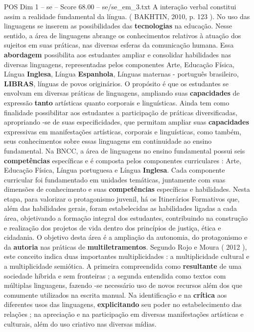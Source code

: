 \begin{textsample}{POS Dim 1 – se – Score 68.00 – se/se\_em\_3.txt}
A interação verbal constitui assim a realidade fundamental da língua. ( BAKHTIN, 2010, p. 123 ).
No uso das linguagens se inserem as possibilidades das \textbf{tecnologias} na educação.
Nesse sentido, a área de linguagens abrange os conhecimentos relativos à atuação dos sujeitos em suas práticas, nas diversas esferas da comunicação humana.
Essa \textbf{abordagem} possibilita aos estudantes ampliar e consolidar habilidades nas diversas linguagens, representadas pelos componentes Arte, Educação Física, Língua \textbf{Inglesa}, Língua \textbf{Espanhola}, Línguas maternas - português brasileiro, \textbf{LIBRAS}, línguas de povos originários.
O propósito é que os estudantes se envolvam em diversas práticas de linguagens, ampliando suas \textbf{capacidades} de expressão \textbf{tanto} artísticas quanto corporais e linguísticas.
Ainda tem como finalidade possibilitar aos estudantes a participação de práticas diversificadas, apropriando -se de suas especificidades, que permitam ampliar suas \textbf{capacidades} expressivas em manifestações artísticas, corporais e linguísticas, como também, seus conhecimentos sobre essas linguagens em continuidade ao ensino fundamental.
Na BNCC, a área de linguagens no ensino fundamental possui seis \textbf{competências} específicas e é composta pelos componentes curriculares : Arte, Educação Física, Língua portuguesa e Língua \textbf{Inglesa}.
Cada componente curricular foi fundamentado em unidades temáticas, juntamente com suas dimensões de conhecimento e suas \textbf{competências} específicas e habilidades.
Nesta etapa, para valorizar o protagonismo juvenil, há os Itinerários Formativos que, além das habilidades gerais, foram estabelecidas as habilidades ligadas a cada área, objetivando a formação integral dos estudantes, contribuindo na construção e realização dos projetos de vida dentro dos princípios de justiça, ética e cidadania.
O objetivo desta área é a ampliação da autonomia, do protagonismo e da \textbf{autoria} nas práticas de \textbf{multiletramentos}.
Segundo Rojo e Moura ( 2012 ), este conceito indica duas importantes multiplicidades : a multiplicidade cultural e a multiplicidade semiótica.
A primeira compreendida como \textbf{resultante} de uma sociedade híbrida e sem fronteiras ; a segunda entendida como textos com múltiplas linguagens, fazendo -se necessário uso de novos recursos além dos que comumente utilizados na escrita manual.
Na identificação e na \textbf{crítica} aos diferentes usos das linguagens, \textbf{explicitando} seu poder no estabelecimento das relações ; na apreciação e na participação em diversas manifestações artísticas e culturais, além do uso criativo nas diversas mídias.

\end{textsample}
